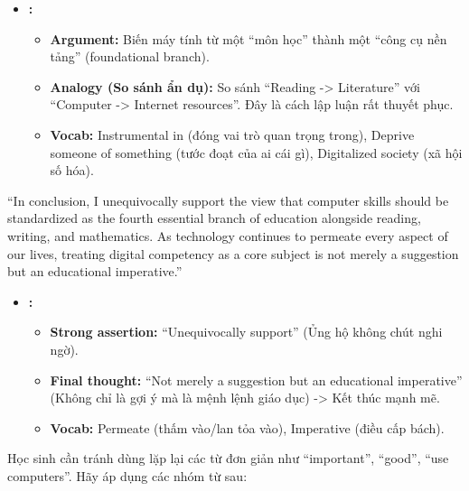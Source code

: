 \begin{itemize}
\tightlist
\item
  \textbf{:}

  \begin{itemize}
  \tightlist
  \item
    \textbf{Argument:} Biến máy tính từ một ``môn học'' thành một ``công
    cụ nền tảng'' (foundational branch).
  \item
    \textbf{Analogy (So sánh ẩn dụ):} So sánh ``Reading -\textgreater{}
    Literature'' với ``Computer -\textgreater{} Internet resources''.
    Đây là cách lập luận rất thuyết phục.
  \item
    \textbf{Vocab:} Instrumental in (đóng vai trò quan trọng trong),
    Deprive someone of something (tước đoạt của ai cái gì), Digitalized
    society (xã hội số hóa).
  \end{itemize}
\end{itemize}


``In conclusion, I unequivocally support the view that computer skills
should be standardized as the fourth essential branch of education
alongside reading, writing, and mathematics. As technology continues to
permeate every aspect of our lives, treating digital competency as a
core subject is not merely a suggestion but an educational imperative.''

\begin{itemize}
\tightlist
\item
  \textbf{:}

  \begin{itemize}
  \tightlist
  \item
    \textbf{Strong assertion:} ``Unequivocally support'' (Ủng hộ không
    chút nghi ngờ).
  \item
    \textbf{Final thought:} ``Not merely a suggestion but an educational
    imperative'' (Không chỉ là gợi ý mà là mệnh lệnh giáo dục)
    -\textgreater{} Kết thúc mạnh mẽ.
  \item
    \textbf{Vocab:} Permeate (thấm vào/lan tỏa vào), Imperative (điều
    cấp bách).
  \end{itemize}
\end{itemize}


Học sinh cần tránh dùng lặp lại các từ đơn giản như ``important'',
``good'', ``use computers''. Hãy áp dụng các nhóm từ sau:

